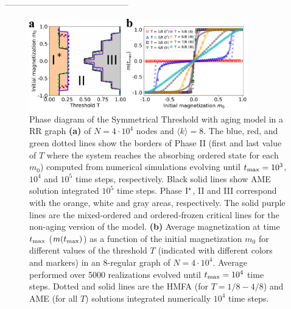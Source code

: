 --------------------------------------------
\begin{figure}
    \centering \captionsetup{font=sf}
    \includegraphics[width=0.85\textwidth]{Figs/Aging_STM/FIG5A.pdf}
    \caption[Symmetrical Threshold model with aging in a random regular network]{\label{REG_PDAGING} Phase diagram of the Symmetrical Threshold with aging model in a RR graph \textbf{(a)} of $N = 4 \cdot 10^4$ nodes and $\langle k \rangle = 8$. The blue, red, and green dotted lines show the borders of Phase II (first and last value of $T$ where the system reaches the absorbing ordered state for each $m_0$) computed from numerical simulations evolving until $t_{\rm max} = 10^3$, $10^4$ and $10^5$ time steps, respectively. Black solid lines show AME solution integrated $10^5$ time steps. Phase ${\rm I}^{*}$, II and III correspond with the orange, white and gray areas, respectively. The solid purple lines are the mixed-ordered and ordered-frozen critical lines for the non-aging version of the model. \textbf{(b)} Average magnetization at time $t_{\rm max}$ ($m(t_{\rm max})$) as a function of the initial magnetization $m_0$ for different values of the threshold $T$ (indicated with different colors and markers) in an 8-regular graph of $N = 4 \cdot 10^4$. Average performed over 5000 realizations evolved until $t_{\rm max} = 10^4$ time steps. Dotted and solid lines are the HMFA (for $T = 1/8 - 4/8$) and AME (for all $T$) solutions integrated numerically $10^4$ time steps.}
\end{figure}

